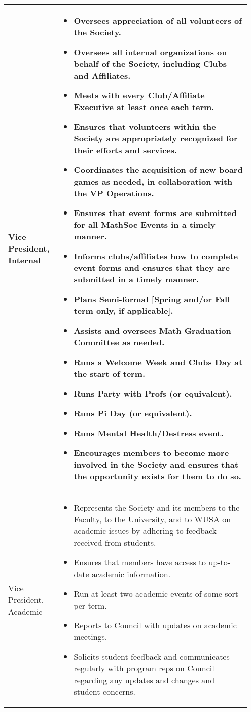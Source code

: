 \begin{longtable}{p{0.2\linewidth} p{0.75\linewidth}}
\\
\midrule
Vice President, Internal &
\begin{itemize}
\item Oversees appreciation of all volunteers of the Society.
\item Oversees all internal organizations on behalf of the Society, including Clubs and Affiliates.
\item Meets with every Club/Affiliate Executive at least once each term.
\item Ensures that volunteers within the Society are appropriately recognized for their efforts and services.
\item Coordinates the acquisition of new board games as needed, in collaboration with the VP Operations.
\item Ensures that event forms are submitted for all MathSoc Events in a timely manner.
\item Informs clubs/affiliates how to complete event forms and ensures that they are submitted in a timely manner.
\item Plans Semi-formal [Spring and/or Fall term only, if applicable].
\item Assists and oversees Math Graduation Committee as needed.
\item Runs a Welcome Week and Clubs Day at the start of term.
\item Runs Party with Profs (or equivalent).
\item Runs Pi Day (or equivalent).
\item Runs Mental Health/Destress event.
\item Encourages members to become more involved in the Society and ensures that the opportunity exists for them to do so.
\end{itemize}
\\
\midrule
Vice President, Academic &
\begin{itemize}
\item Represents the Society and its members to the Faculty, to the University, and to WUSA on academic issues by adhering to feedback received from students.
\item Ensures that members have access to up-to-date academic information.
\item Run at least two academic events of some sort per term.
\item Reports to Council with updates on academic meetings.
\item Solicits student feedback and communicates regularly with program reps on Council regarding any updates and changes and student concerns.

\end{itemize}
\end{longtable}
